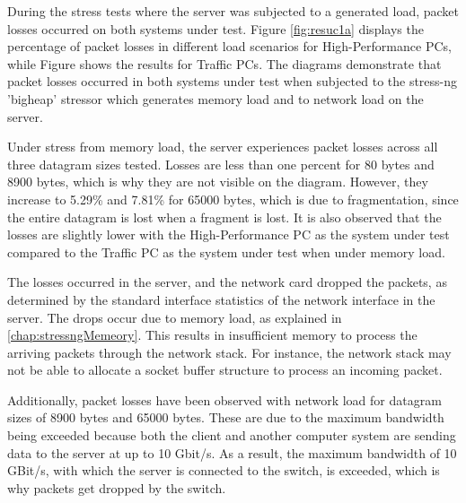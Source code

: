 During the stress tests where the server was subjected to a generated load, packet losses occurred on both systems under test. Figure \ref{fig:resuc1a} displays the percentage of packet losses in different load scenarios for High-Performance PCs, while Figure \label{fig:resuc1b} shows the results for Traffic PCs. The diagrams demonstrate that packet losses occurred in both systems under test when subjected to the stress-ng 'bigheap' stressor which generates memory load and to network load on the server.

Under stress from memory load, the server experiences packet losses across all three datagram sizes tested. Losses are less than one percent for 80 bytes and 8900 bytes, which is why they are not visible on the diagram. However, they increase to 5.29\% and 7.81\% for 65000 bytes, which is due to fragmentation, since the entire datagram is lost when a fragment is lost. It is also observed that the losses are slightly lower with the High-Performance PC as the system under test compared to the Traffic PC as the system under test when under memory load.

The losses occurred in the server, and the network card dropped the packets, as determined by the standard interface statistics of the network interface in the server. The drops occur due to memory load, as explained in \ref{chap:stressngMemeory}. This results in insufficient memory to process the arriving packets through the network stack. For instance, the network stack may not be able to allocate a socket buffer structure to process an incoming packet.

Additionally, packet losses have been observed with network load for datagram sizes of 8900 bytes and 65000 bytes. These are due to the maximum bandwidth being exceeded because both the client and another computer system are sending data to the server at up to 10 Gbit/s. As a result, the maximum bandwidth of 10 GBit/s, with which the server is connected to the switch, is exceeded, which is why packets get dropped by the switch.

